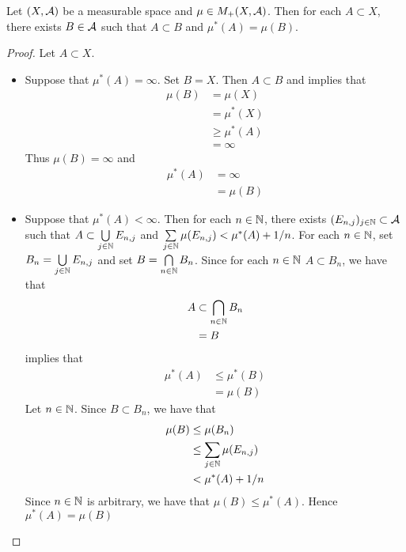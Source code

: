 \documentclass{book}
\begin{document}
	\begin{ex} 
		Let $(X, \mathcal{A})$ be a measurable space and $\mu \in M_+(X, \mathcal{A})$. Then for each $A \subset X$, there exists $B \in \mathcal{A}$ such that $A \subset B$ and $\mu^*(A) = \mu(B)$. 
	\end{ex}
	
	\begin{proof}
		Let $A \subset X$.
		\begin{itemize}
			\item  Suppose that $\mu^*(A) = \infty$. Set $B = X$. Then $A \subset B$ and  implies that
			\begin{align*}
				\mu(B)
				& = \mu(X) \\
				& = \mu^*(X) \\
				& \geq \mu^*(A) \\
				& = \infty 
			\end{align*}
			Thus $\mu(B) = \infty$ and 
			\begin{align*}
				\mu^*(A) 
				& = \infty \\
				& = \mu(B)
			\end{align*} 
			\item Suppose that $\mu^*(A) < \infty$. Then for each $n \in \mathbb{N}$, there exists $(E_{n,j})_{j \in \mathbb{N}} \subset \mathcal{A}$ such that $A \subset \bigcup\limits_{j \in \mathbb{N}} E_{n,j}$ and $\sum\limits_{j \in \mathbb{N}} \mu(E_{n,j}) < \mu^*(A) + 1/n$. For each $n \in \mathbb{N}$, set $B_n = \bigcup\limits_{j \in \mathbb{N}} E_{n,j} $ and set $B = \bigcap\limits_{n \in \mathbb{N}} B_n$. Since for each $n \in \mathbb{N}$ $A \subset B_n$, we have that 
			\begin{align*}
				A
				& \subset \bigcap\limits_{n \in \mathbb{N}} B_n \\
				& = B
			\end{align*}
			 implies that
			\begin{align*}
				\mu^*(A)
				& \leq \mu^*(B) \\
				& = \mu(B)
			\end{align*}
			Let $n \in \mathbb{N}$. Since $B \subset B_n$, we have that 
			\begin{align*}
				\mu(B)
				& \leq \mu(B_n) \\
				& \leq \sum_{j \in \mathbb{N}} \mu(E_{n,j}) \\
				& < \mu^*(A) + 1/n 
			\end{align*}
			Since $n \in \mathbb{N}$ is arbitrary, we have that $\mu(B) \leq \mu^*(A)$. Hence $\mu^*(A) = \mu(B)$
		\end{itemize}
	\end{proof}
\end{document}
